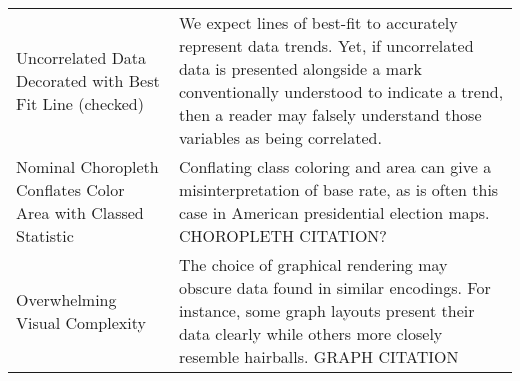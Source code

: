 \begin{longtable}{p{5cm}p{12cm}}
 \rowcolor{colorc}Uncorrelated Data Decorated with Best Fit Line (checked) & We expect lines of best-fit to accurately represent data trends. Yet, if uncorrelated data is presented alongside a mark conventionally understood to indicate a trend, then a reader may falsely understand those variables as being correlated.   \\
 \rowcolor{colorc-opaque}Nominal Choropleth Conflates Color Area with Classed Statistic & Conflating class coloring and area can give a misinterpretation of base rate, as is often this case in American presidential election maps.  \cite{gastner2005maps} CHOROPLETH CITATION?\\
 \rowcolor{colorc}Overwhelming Visual Complexity & The choice of graphical rendering may obscure data found in similar encodings. For instance, some graph layouts present their data clearly while others more closely resemble hairballs. \cite{hofmann2012graphical} GRAPH CITATION\\


\end{longtable}
